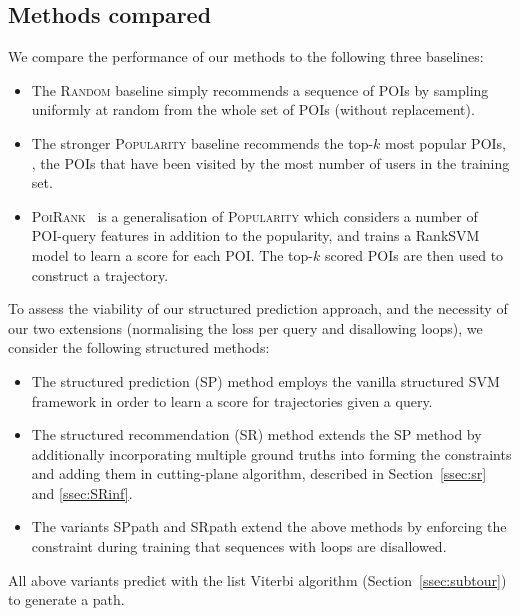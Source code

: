 \secmoveup
\subsection{Methods compared}
\textmoveup

We compare the performance of our methods to the following three baselines:
\begin{itemize}[leftmargin=0.125in]\itemmoveup
\parskip -.05em
\item The \textsc{Random} baseline simply recommends a sequence of POIs by sampling uniformly at random from the whole set of POIs (without replacement).

\item The stronger \textsc{Popularity} baseline recommends the top-$k$ most popular POIs, 
      \ie, the POIs that have been visited by the most number of users in the training set.

\item \textsc{PoiRank}~\cite{cikm16paper} is a generalisation of \textsc{Popularity} 
      which considers a number of POI-query features in addition to the popularity,
      and trains a RankSVM model to learn a score for each POI. The top-$k$ scored POIs are then used to construct a trajectory.
\end{itemize}\itemmoveup

To assess the viability of our structured prediction approach, and the necessity of our two extensions (normalising the loss per query and disallowing loops), we consider the following structured methods: %
\begin{itemize}[leftmargin=0.125in]\itemmoveup
\parskip -.05em
\item The structured prediction ({\sc SP}) method employs the vanilla structured SVM framework in order to learn a score for trajectories given a query.

\item The structured recommendation ({\sc SR}) method extends the {\sc SP} method by additionally incorporating multiple ground truths into
      forming the constraints and adding them in cutting-plane algorithm,
      described in Section~\ref{ssec:sr} and \ref{ssec:SRinf}.

\item The variants {\sc SPpath} and {\sc SRpath} extend the above methods by enforcing the constraint during training 
      that sequences with loops are disallowed.
\end{itemize}\itemmoveup
All above variants predict with the list Viterbi algorithm (Section~\ref{ssec:subtour}) to generate a path.


